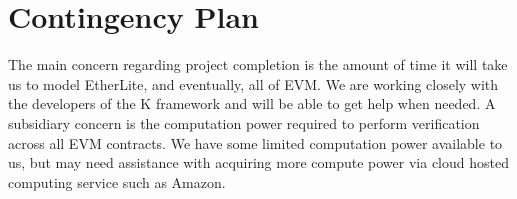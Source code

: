 \section{Contingency Plan}

The main concern regarding project completion is the amount of time it will
take us to model EtherLite, and eventually, all of EVM. We are working closely
with the developers of the K framework and will be able to get help when
needed. A subsidiary concern is the computation power required to perform
verification across all EVM contracts.  We have some limited computation power
available to us, but may need assistance with acquiring more compute power via
cloud hosted computing service such as Amazon. 


